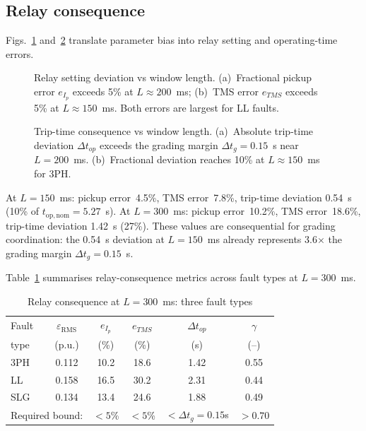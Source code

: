 \documentclass[journal,twoside,letterpaper]{IEEEtran}
\begin{document}
\subsection{Relay consequence}

Figs.~\ref{fig:relay_deviation} and~\ref{fig:triptime_consequence}
translate parameter bias into relay setting and operating-time
errors.

\begin{figure}[!t]
  \centering
  
  \caption{Relay setting deviation vs window length.
    (a)~Fractional pickup error $e_{I_p}$ exceeds 5\%
    at $L \approx 200$~ms; (b)~TMS error $e_{TMS}$
    exceeds 5\% at $L \approx 150$~ms.
    Both errors are largest for LL faults.}
  \label{fig:relay_deviation}
\end{figure}

\begin{figure}[!t]
  \centering
  
  \caption{Trip-time consequence vs window length.
    (a)~Absolute trip-time deviation $\Delta t_{op}$
    exceeds the grading margin $\Delta t_g = 0.15$~s
    near $L = 200$~ms.
    (b)~Fractional deviation reaches 10\% at
    $L \approx 150$~ms for 3PH.}
  \label{fig:triptime_consequence}
\end{figure}

At $L = 150$~ms: pickup error~4.5\%, TMS error~7.8\%,
trip-time deviation 0.54~s (10\% of $t_{\mathrm{op,nom}} = 5.27$~s).
At $L = 300$~ms: pickup error~10.2\%, TMS error~18.6\%,
trip-time deviation 1.42~s (27\%).
These values are consequential for grading coordination: the
0.54~s deviation at $L = 150$~ms already represents 3.6$\times$
the grading margin $\Delta t_g = 0.15$~s.

Table~\ref{tab:relay_consequence} summarises relay-consequence
metrics across fault types at $L = 300$~ms.

\begin{table}[!t]
\caption{Relay consequence at $L = 300$~ms: three fault types}
\label{tab:relay_consequence}
\centering
\renewcommand{\arraystretch}{1.15}
\begin{tabular}{lccccc}
\toprule
Fault & $\varepsilon_{\mathrm{RMS}}$ & $e_{I_p}$ & $e_{TMS}$ &
        $\Delta t_{op}$ & $\gamma$ \\
type  & (p.u.) & (\%) & (\%) & (s) & (--) \\
\midrule
3PH   & 0.112 & 10.2 & 18.6 & 1.42 & 0.55 \\
LL    & 0.158 & 16.5 & 30.2 & 2.31 & 0.44 \\
SLG   & 0.134 & 13.4 & 24.6 & 1.88 & 0.49 \\
\midrule
\multicolumn{2}{l}{Required bound:} & $<5$\% & $<5$\% &
   $<\Delta t_g=0.15$s & $>0.70$ \\
\bottomrule
\end{tabular}
\end{table}
\end{document}
